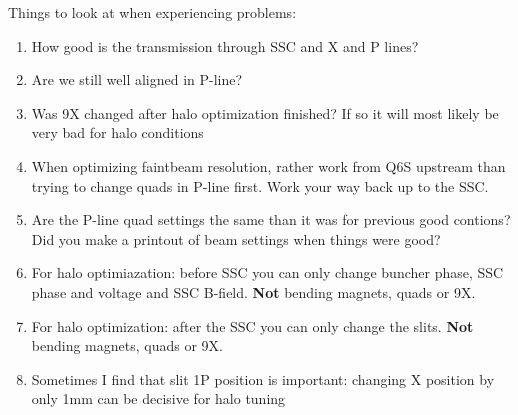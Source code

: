 \documentclass[11pt]{report}
\begin{document}
Things to look at when experiencing problems:
\begin{enumerate}   
	\item How good is the transmission through SSC and X and P lines?
	\item Are we still well aligned in P-line?
	\item Was 9X changed after halo optimization finished? If so it will most
	      likely be very bad for halo conditions
	\item When optimizing faintbeam resolution, rather work from Q6S upstream
	      than trying to change quads in P-line first. Work your way back up to the SSC.
	\item Are the P-line quad settings the same than it was for previous good contions?	
	      Did you make a printout of beam settings when things were good? 
	\item For halo optimiazation: before SSC you can only change buncher phase, SSC phase and voltage and SSC B-field.
	       {\bf Not} bending magnets, quads or 9X.
	\item For halo optimization: after the SSC you can only change the slits. {\bf Not} bending magnets, quads or 9X.
        \item Sometimes I find that slit 1P position is important: changing X position by only 1mm can be decisive for halo tuning
 
\end{enumerate}  
\end{document}

